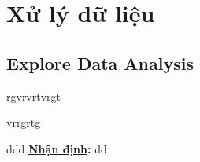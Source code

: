 \chapter{Xử lý dữ liệu}

\section{Explore Data Analysis}

rgvrvrtvrgt \par
vrrgrtg \par

ddd \textbf{\underline{Nhận định}:} dd
